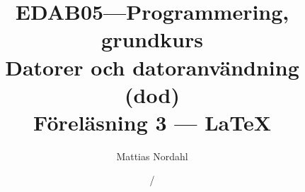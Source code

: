 \documentclass[handout]{beamer}
\author[]{Mattias Nordahl}
\institute{\url{mattias.nordahl@cs.lth.se}}
\date{}
\begin{document}
\title{{\small\bf EDAB05---Programmering, grundkurs}\\Datorer och datoranvändning (dod)\\Föreläsning 3 --- \LaTeX}

\frame[plain]{
    \maketitle
}

\date{\the\year/\the\numexpr{}}


\end{document}
